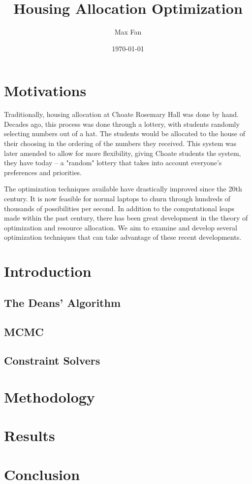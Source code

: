 \documentclass[11pt]{article}
\author{Max Fan}
\date{\today}
\title{Housing Allocation Optimization}
\begin{document}
\maketitle

\section{Motivations}
\label{sec:org47c1139}
Traditionally, housing allocation at Choate Rosemary Hall was done by hand.
Decades ago, this process was done through a lottery, with students randomly selecting numbers out of a hat.
The students would be allocated to the house of their choosing in the ordering of the numbers they received.
This system was later amended to allow for more flexibility, giving Choate students the system, they have today -- a "random" lottery that takes into account everyone's preferences and priorities.

The optimization techniques available have drastically improved since the 20th century.
It is now feasible for normal laptops to churn through hundreds of thousands of possibilities per second.
In addition to the computational leaps made within the past century, there has been great development in the theory of optimization and resource allocation.
We aim to examine and develop several optimization techniques that can take advantage of these recent developments.

\section{Introduction}
\label{sec:orgc44ba09}

\subsection{The Deans' Algorithm}
\label{sec:orgea12a01}

\subsection{MCMC}
\label{sec:orga95e088}

\subsection{Constraint Solvers}
\label{sec:org640dd4f}

\section{Methodology}
\label{sec:orgc0ba115}

\section{Results}
\label{sec:org9690729}

\section{Conclusion}
\label{sec:orgb6da137}
\end{document}
